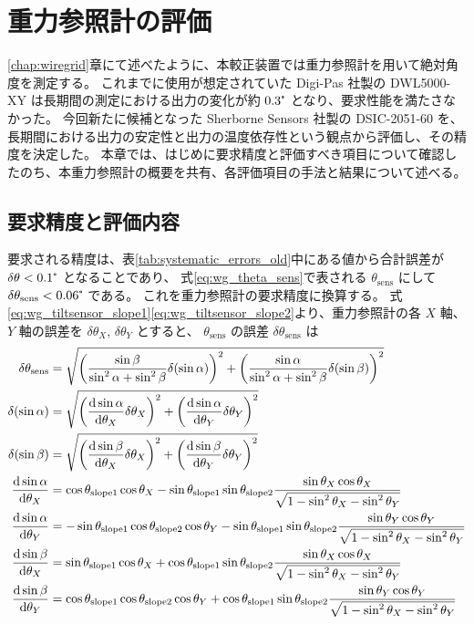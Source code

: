 \documentclass[../../main.tex]{subfiles}
\begin{document}
\chapter{重力参照計の評価}
\label{chap:tiltsensor}

\ref{chap:wiregrid}章にて述べたように、本較正装置では重力参照計を用いて絶対角度を測定する。
これまでに使用が想定されていた Digi-Pas 社製の DWL5000-XY は長期間の測定における出力の変化が約 $0.3\tcdegree$ となり、要求性能を満たさなかった。
今回新たに候補となった Sherborne Sensors 社製の DSIC-2051-60 を、長期間における出力の安定性と出力の温度依存性という観点から評価し、その精度を決定した。
本章では、はじめに要求精度と評価すべき項目について確認したのち、本重力参照計の概要を共有、各評価項目の手法と結果について述べる。
\section{要求精度と評価内容}
要求される精度は、表\ref{tab:systematic_errors_old}中にある値から合計誤差が $\delta\theta < 0.1\tcdegree$ となることであり、
式\eqref{eq:wg_theta_sens}で表される $\theta_{\mathrm{sens}}$ にして $\delta\theta_{\mathrm{sens}}<0.06\tcdegree$ である。
これを重力参照計の要求精度に換算する。
式\eqref{eq:wg_tiltsensor_slope1}\eqref{eq:wg_tiltsensor_slope2}より、重力参照計の各 $X$ 軸、$Y$ 軸の誤差を $\delta\theta_{X},\,\delta\theta_{Y}$ とすると、
$\theta_{\mathrm{sens}}$ の誤差 $\delta\theta_{\mathrm{sens}}$ は
\begin{align}
    \label{eq:gosadenpa1}
    \delta\theta_{\mathrm{sens}} &= 
        \sqrt{\qty(\dfrac{\sin\beta}{\sin^2\alpha+\sin^2\beta} \delta\qty(\sin\alpha))^2 + \qty(\dfrac{\sin\alpha}{\sin^2\alpha+\sin^2\beta} \delta\qty(\sin\beta))^2}\\ 
    \delta\qty(\sin\alpha) &= \sqrt{\qty(\dv{\sin\alpha}{\theta_X}\delta\theta_X)^2+\qty(\dv{\sin\alpha}{\theta_Y}\delta\theta_Y)^2}\\
    \delta\qty(\sin\beta) &= \sqrt{\qty(\dv{\sin\beta}{\theta_X}\delta\theta_X)^2+\qty(\dv{\sin\beta}{\theta_Y}\delta\theta_Y)^2} \\
    \dv{\sin\alpha}{\theta_X} &= \cos\theta_{\mathrm{slope}1}\cos\theta_X - \sin\theta_{\mathrm{slope}1}\sin\theta_{\mathrm{slope}2}\dfrac{\sin\theta_X\cos\theta_X}{\sqrt{1-\sin^2\theta_X-\sin^2\theta_Y}} \\
    \dv{\sin\alpha}{\theta_Y} &= -\sin\theta_{\mathrm{slope}1}\cos\theta_{\mathrm{slope}2}\cos\theta_Y - \sin\theta_{\mathrm{slope}1}\sin\theta_{\mathrm{slope}2}\dfrac{\sin\theta_Y\cos\theta_Y}{\sqrt{1-\sin^2\theta_X-\sin^2\theta_Y}} \\
    \dv{\sin\beta}{\theta_X} &= \sin\theta_{\mathrm{slope}1}\cos\theta_X + \cos\theta_{\mathrm{slope}1}\sin\theta_{\mathrm{slope}2}\dfrac{\sin\theta_X\cos\theta_X}{\sqrt{1-\sin^2\theta_X-\sin^2\theta_Y}} \\
    \label{eq:gosadnepa2}
    \dv{\sin\beta}{\theta_Y} &= \cos\theta_{\mathrm{slope}1}\cos\theta_{\mathrm{slope}2}\cos\theta_Y + \cos\theta_{\mathrm{slope}1}\sin\theta_{\mathrm{slope}2}\dfrac{\sin\theta_Y\cos\theta_Y}{\sqrt{1-\sin^2\theta_X-\sin^2\theta_Y}}
\end{align}
\end{document}
